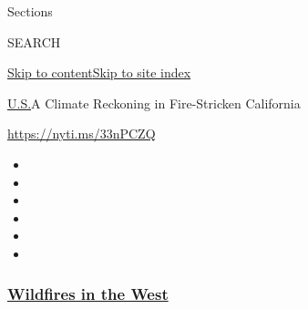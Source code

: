 Sections

SEARCH

\protect\hyperlink{site-content}{Skip to
content}\protect\hyperlink{site-index}{Skip to site index}

\href{/section/us}{U.S.}\textbar{}A Climate Reckoning in Fire-Stricken
California

\url{https://nyti.ms/33nPCZQ}

\begin{itemize}
\item
\item
\item
\item
\item
\item
\end{itemize}

\hypertarget{wildfires-in-the-west}{%
\subsubsection{\texorpdfstring{\href{https://www.nytimes3xbfgragh.onion/spotlight/california-wildfires?name=styln-california-wildfires\&region=TOP_BANNER\&block=storyline_menu_recirc\&action=click\&pgtype=Article\&impression_id=4909cac0-f4c3-11ea-989a-419b1be2eba7\&variant=undefined}{Wildfires
in the West}}{Wildfires in the West}}\label{wildfires-in-the-west}}

